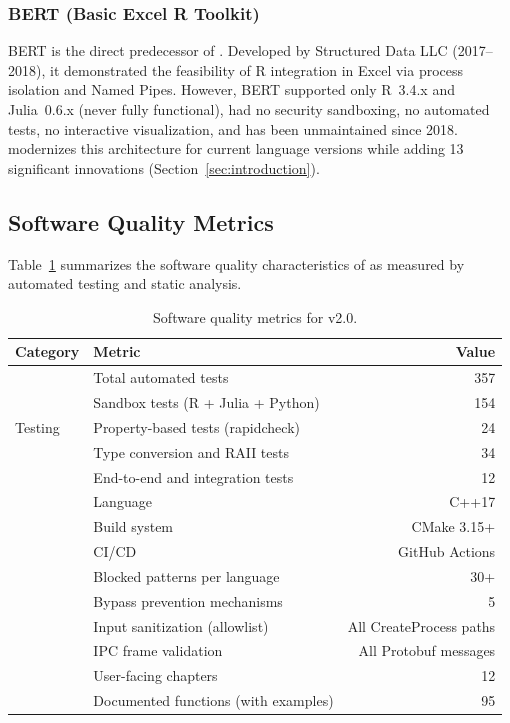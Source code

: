 \subsubsection{BERT (Basic Excel R Toolkit)}

BERT \citep{BERT2018} is the direct predecessor of \neven{}. Developed by Structured Data LLC (2017--2018), it demonstrated the feasibility of R integration in Excel via process isolation and Named Pipes. However, BERT supported only R~3.4.x and Julia~0.6.x (never fully functional), had no security sandboxing, no automated tests, no interactive visualization, and has been unmaintained since 2018. \neven{} modernizes this architecture for current language versions while adding 13 significant innovations (Section~\ref{sec:introduction}).

\subsection{Software Quality Metrics}

Table~\ref{tab:quality} summarizes the software quality characteristics of \neven{} as measured by automated testing and static analysis.

\begin{table}[htbp]
\centering
\caption{Software quality metrics for \neven{} v2.0.}
\label{tab:quality}
\begin{tabular}{@{}llr@{}}
\toprule
\textbf{Category} & \textbf{Metric} & \textbf{Value} \\
\midrule
\multirow{5}{*}{Testing} & Total automated tests & 357 \\
 & Sandbox tests (R + Julia + Python) & 154 \\
 & Property-based tests (rapidcheck) & 24 \\
 & Type conversion and RAII tests & 34 \\
 & End-to-end and integration tests & 12 \\
\addlinespace
\multirow{3}{*}{Code quality} & Language & C++17 \\
 & Build system & CMake 3.15+ \\
 & CI/CD & GitHub Actions \\
\addlinespace
\multirow{4}{*}{Security} & Blocked patterns per language & 30+ \\
 & Bypass prevention mechanisms & 5 \\
 & Input sanitization (allowlist) & All CreateProcess paths \\
 & IPC frame validation & All Protobuf messages \\
\addlinespace
\multirow{2}{*}{Documentation} & User-facing chapters & 12 \\
 & Documented functions (with examples) & 95 \\
\bottomrule
\end{tabular}
\end{table}

